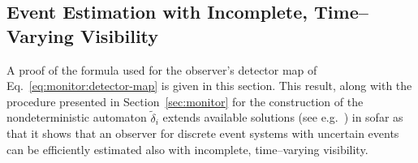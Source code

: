 

\appendix

\subsection{Event Estimation with Incomplete, Time--Varying Visibility}
\label{sec:proofs}

A proof of the formula used for the observer's detector map of Eq.~\ref{eq:monitor:detector-map} is given in this section. This result, along with the procedure presented in Section~\ref{sec:monitor} for the construction of the nondeterministic automaton $\tilde{\delta}_i$ extends available solutions (see e.g.~\cite{cassandras}) in sofar as that it shows that an observer for discrete event systems with uncertain events can be efficiently estimated also with incomplete, time--varying visibility. 

